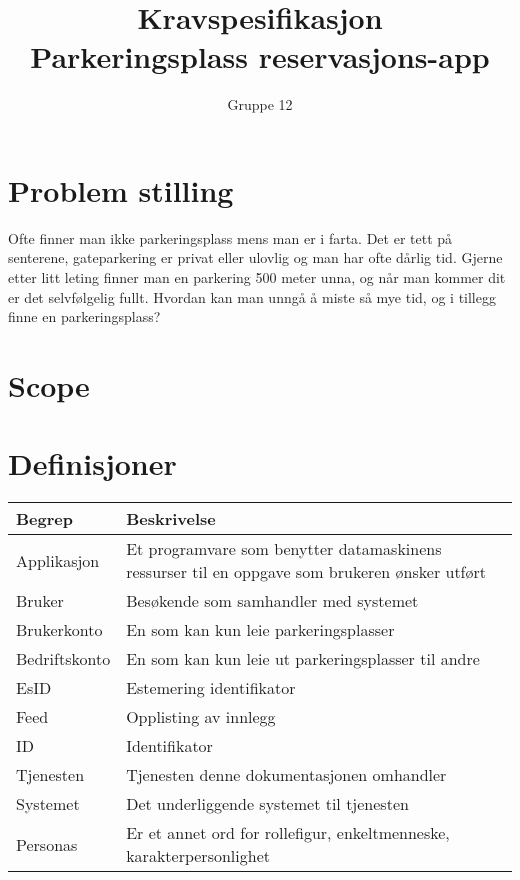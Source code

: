 \documentclass[12pt]{article}
\begin{document}
\title{%
    Kravspesifikasjon\\
    \large Parkeringsplass reservasjons-app }
\author{Gruppe 12}
\date{}
\maketitle

\newpage

\tableofcontents

\newpage

\section{Problem stilling}

Ofte finner man ikke parkeringsplass mens man er i farta. Det er tett på senterene, gateparkering er privat eller ulovlig og man har ofte dårlig tid. Gjerne etter litt leting finner man en parkering 500 meter unna, og når man kommer dit er det selvfølgelig fullt. Hvordan kan man unngå å miste så mye tid, og i tillegg finne en parkeringsplass?

\section{Scope}

\section{Definisjoner}

\begin{center}
    \begin{tabular}{|p{4cm}|p{12cm}| } 
        \hline
        \bf Begrep & \bf Beskrivelse \\
        \hline
        Applikasjon &  Et programvare som benytter datamaskinens ressurser til en oppgave som brukeren ønsker utført \\
        \hline
        Bruker & Besøkende som samhandler med systemet \\
        \hline
        Brukerkonto & En som kan kun leie parkeringsplasser \\
        \hline
        Bedriftskonto & En som kan kun leie ut parkeringsplasser til andre \\
        \hline
        EsID & Estemering identifikator \\
        \hline
        Feed & Opplisting av innlegg \\
        \hline
        ID & Identifikator \\
        \hline
        Tjenesten & Tjenesten denne dokumentasjonen omhandler \\
        \hline
        Systemet & Det underliggende systemet til tjenesten \\
        \hline
        Personas & Er et annet ord for rollefigur, enkeltmenneske, karakterpersonlighet\\
        \hline
    \end{tabular}
\end{center}
\end{document}
